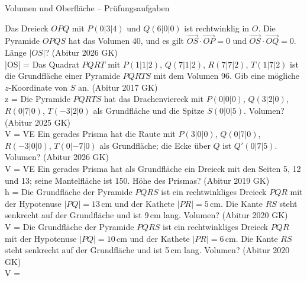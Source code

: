 \begin{aufgabe}{Volumen und Oberfläche – Prüfungsaufgaben}
\begin{teile}
\teil Das Dreieck $OPQ$ mit $P(0 | 3 | 4)$ und $Q(6 | 0 | 0)$ ist rechtwinklig in $O$. Die Pyramide $OPQS$ hat das Volumen 40, und es gilt $\overrightarrow{OS} \cdot \overrightarrow{OP} = 0$ und $\overrightarrow{OS} \cdot \overrightarrow{OQ} = 0$. Länge $|OS|$? \hfill (Abitur 2026 GK) \\ |OS| = \leerfeld
\teil Das Quadrat $PQRT$ mit $P(1 | 1 | 2)$, $Q(7 | 1 | 2)$, $R(7 | 7 | 2)$, $T(1 | 7 | 2)$ ist die Grundfläche einer Pyramide $PQRTS$ mit dem Volumen 96. Gib eine mögliche $z$-Koordinate von $S$ an. \hfill (Abitur 2017 GK) \\ z = \leerfeld
\teil Die Pyramide $PQRTS$ hat das Drachenviereck mit $P(0 | 0 | 0)$, $Q(3 | 2 | 0)$, $R(0 | 7 | 0)$, $T(-3 | 2 | 0)$ als Grundfläche und die Spitze $S(0 | 0 | 5)$. Volumen? \hfill (Abitur 2025 GK) \\ V = \leerfeld VE
\teil Ein gerades Prisma hat die Raute mit $P(3 | 0 | 0)$, $Q(0 | 7 | 0)$, $R(-3 | 0 | 0)$, $T(0 | -7 | 0)$ als Grundfläche; die Ecke über $Q$ ist $Q'(0 | 7 | 5)$. Volumen? \hfill (Abitur 2026 GK) \\ V = \leerfeld VE
\teil Ein gerades Prisma hat als Grundfläche ein Dreieck mit den Seiten 5, 12 und 13; seine Mantelfläche ist 150. Höhe des Prismas? \hfill (Abitur 2019 GK) \\ h = \leerfeld
\teil Die Grundfläche der Pyramide $PQRS$ ist ein rechtwinkliges Dreieck $PQR$ mit der Hypotenuse $|PQ| = 13\,\mathrm{cm}$ und der Kathete $|PR| = 5\,\mathrm{cm}$. Die Kante $RS$ steht senkrecht auf der Grundfläche und ist 9\,cm lang. Volumen? \hfill (Abitur 2020 GK) \\ V = \leerfeld[cm³]
\teil Die Grundfläche der Pyramide $PQRS$ ist ein rechtwinkliges Dreieck $PQR$ mit der Hypotenuse $|PQ| = 10\,\mathrm{cm}$ und der Kathete $|PR| = 6\,\mathrm{cm}$. Die Kante $RS$ steht senkrecht auf der Grundfläche und ist 5\,cm lang. Volumen? \hfill (Abitur 2020 GK) \\ V = \leerfeld[cm³]
\end{teile}
\end{aufgabe}

